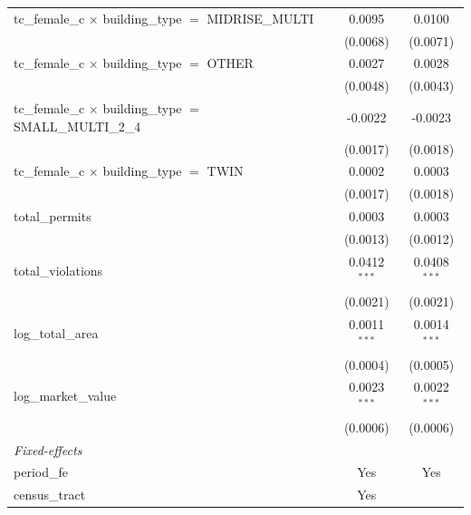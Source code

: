 \begin{tabular}{lcc}
   tc\_female\_c $\times$ building\_type $=$ MIDRISE\_MULTI            & 0.0095         & 0.0100\\   
                                                                       & (0.0068)       & (0.0071)\\   
   tc\_female\_c $\times$ building\_type $=$ OTHER                     & 0.0027         & 0.0028\\   
                                                                       & (0.0048)       & (0.0043)\\   
   tc\_female\_c $\times$ building\_type $=$ SMALL\_MULTI\_2\_4        & -0.0022        & -0.0023\\   
                                                                       & (0.0017)       & (0.0018)\\   
   tc\_female\_c $\times$ building\_type $=$ TWIN                      & 0.0002         & 0.0003\\   
                                                                       & (0.0017)       & (0.0018)\\   
   total\_permits                                                      & 0.0003         & 0.0003\\   
                                                                       & (0.0013)       & (0.0012)\\   
   total\_violations                                                   & 0.0412$^{***}$ & 0.0408$^{***}$\\   
                                                                       & (0.0021)       & (0.0021)\\   
   log\_total\_area                                                    & 0.0011$^{***}$ & 0.0014$^{***}$\\   
                                                                       & (0.0004)       & (0.0005)\\   
   log\_market\_value                                                  & 0.0023$^{***}$ & 0.0022$^{***}$\\   
                                                                       & (0.0006)       & (0.0006)\\   
   \midrule
   \emph{Fixed-effects}\\
   period\_fe                                                          & Yes            & Yes\\  
   census\_tract                                                       & Yes            & \\  

\end{tabular}
